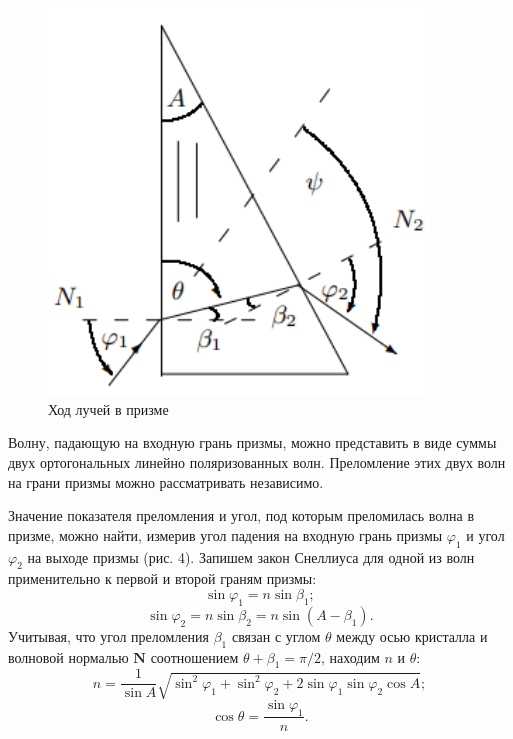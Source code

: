 \documentclass[a4paper,12pt]{article}
\begin{document}
\begin{figure}\label{fig: Rays in prism}
    \begin{center}
    \vspace{-20pt}
        \includegraphics[width = 0.9\textwidth]{Rays in prism.png}
    \end{center}
    \caption{Ход лучей в призме}
\end{figure}
Волну, падающую на входную грань призмы, можно представить в виде суммы двух ортогональных линейно поляризованных волн. Преломление этих двух волн на грани призмы можно рассматривать независимо.

Значение показателя преломления и угол, под которым преломилась волна в призме, можно найти, измерив угол падения на входную грань призмы $\varphi_1$ и угол $\varphi_2$ на выходе призмы (рис. 4). Запишем закон Снеллиуса для одной из волн применительно к первой
и второй граням призмы:
\[\sin\varphi_1 = n \sin\beta_1;\]
\[\sin\varphi_2 = n\sin\beta_2 = n\sin(A - \beta_1).\]
Учитывая, что угол преломления $\beta_1$ связан с углом $\theta$ между осью кристалла
и волновой нормалью $\mathbf{N}$ соотношением $\theta + \beta_1 = \pi / 2$, находим $n$ и $\theta$:
\begin{equation}\label{eq: n in prism}
    n = \frac{1}{\sin A}\sqrt{\sin^2\varphi_1 + \sin^2\varphi_2 + 2\sin\varphi_1\sin\varphi_2\cos A};
\end{equation}
\[\cos\theta = \frac{\sin\varphi_1}{n}.\]
\end{document}
